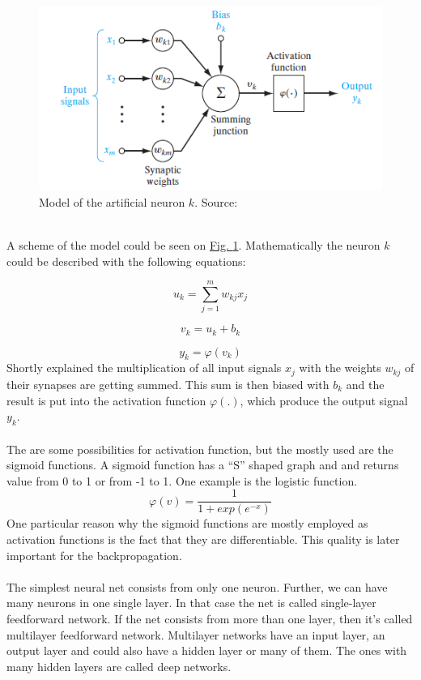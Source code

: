\documentclass[runningheads,a4paper]{llncs}[2015/06/24]
\begin{document}
\begin{figure}[h]
\centering
\includegraphics[width=\textwidth]{neuronModel}
\caption{Model of the artificial neuron $k$. Source: \cite{haykin2009neural}}
\label{fig:neuronModel}
\end{figure}

\hspace{1cm}\\ A scheme of the model could be seen on \hyperref[fig:neuronModel]{Fig. \ref{fig:neuronModel}}. Mathematically the neuron $k$ could be described with the following equations:

\begin{equation}
u_k = \sum_{j=1}^{m} w_{kj}x_j
\end{equation}

\begin{equation}
v_k = u_k + b_k
\end{equation}

\begin{equation}
y_k = φ(v_k)
\end{equation}Shortly explained the multiplication of all input signals $x_j$ with the weights $w_{kj}$ of their synapses are getting summed. This sum is then biased with $b_k$ and the result is put into the activation function $φ(.)$, which produce the output signal $y_k$.\\\\
The are some possibilities for activation function, but the mostly used are the sigmoid functions. A sigmoid function has a \enquote{S} shaped graph and and returns value from 0 to 1 or from -1 to 1. One example is the logistic function.
\begin{equation}
φ(v) = \frac{1}{1 + exp(e^{-x})}
\end{equation}
One particular reason why the sigmoid functions are mostly employed as activation functions is the fact that they are differentiable. This quality is later important for the backpropagation. \\\\The simplest neural net consists from only one neuron. Further, we can have many neurons in one single layer. In that  case the net is called single-layer feedforward network. If the net consists from more than one layer, then it's called multilayer feedforward network. Multilayer networks have an input layer, an output layer and could also have a hidden layer or many of them. The ones with many hidden layers are called deep networks\cite{haykin2009neural}.
\end{document}
